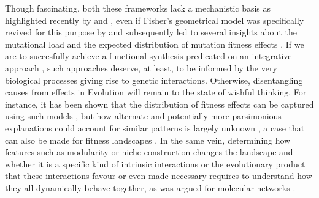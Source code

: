 Though fascinating, both these frameworks lack a mechanistic basis as highlighted recently by \citet{Martin14} and \citet{Yi19}, even if Fisher's geometrical model was specifically revived for this purpose by \citet{Hartl96} and subsequently led to several insights about the mutational load and the expected distribution of mutation fitness effects \citep{Poon00,Martin06,Martin07}. If we are to succesfully achieve a functional synthesis \citep{Dean07} predicated on an integrative approach \citep{Gudelj10}, such approaches deserve, at least, to be informed by the very biological processes giving rise to genetic interactions. Otherwise, disentangling causes from effects in Evolution will remain to the state of wishful thinking. For instance, it has been shown that the distribution of fitness effects can be captured using such models \citep{Martin06,Huber17}, but how alternate and potentially more parsimonious explanations could account for similar patterns is largely unknown \citep{Lourenco11}, a case that can also be made for fitness landscapes \citep{Blanquart16}. In the same vein, determining how features such as modularity \citep{Wagner07,Segre05,Hartwell99} or niche construction \citep{Bajic18} changes the landscape and whether it is a specific kind of intrinsic interactions or the evolutionary product that these interactions favour or even made necessary requires to understand how they all dynamically behave together, as was argued for molecular networks \citep{Alexander09}.


